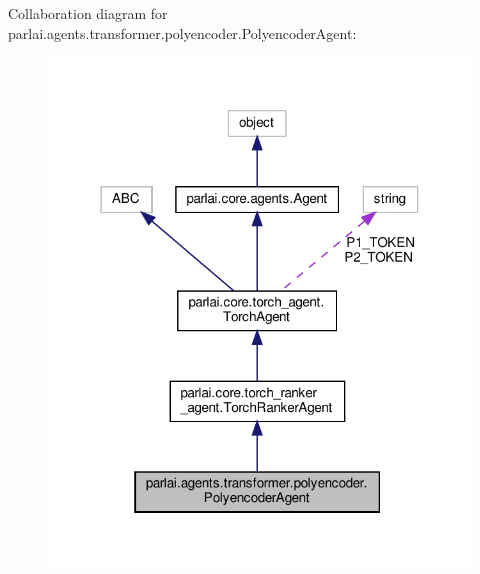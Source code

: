 Collaboration diagram for parlai.\+agents.\+transformer.\+polyencoder.\+Polyencoder\+Agent\+:
\nopagebreak
\begin{figure}[H]
\begin{center}
\leavevmode
\includegraphics[width=318pt]{d5/d11/classparlai_1_1agents_1_1transformer_1_1polyencoder_1_1PolyencoderAgent__coll__graph}
\end{center}
\end{figure}
